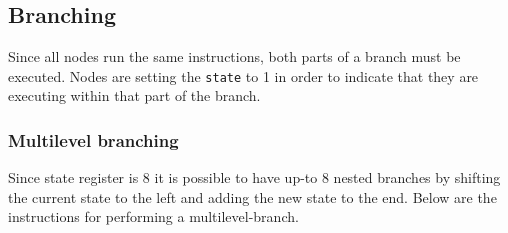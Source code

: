 \subsection{Branching}

Since all nodes run the same instructions, both parts of a branch must be
executed. Nodes are setting the {\tt state} to 1 in order to indicate that they
are executing within that part of the branch.



\subsubsection{Multilevel branching}
Since state register is 8 it is possible to have up-to 8 nested branches by
shifting the current state to the left and adding the new state to the
end. Below  are the
instructions for performing a multilevel-branch.


